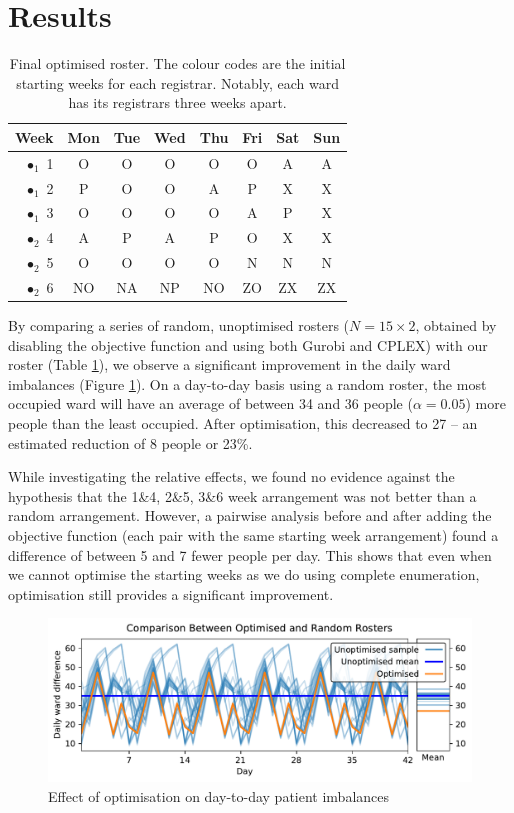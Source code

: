 \documentclass[a4paper]{article}
\begin{document}
\section{Results}
\begin{table}[H]
\centering
\caption{Final optimised roster. The colour codes are the initial starting weeks for each registrar. Notably, each ward has its registrars three weeks apart.}
\label{tab:roster}
\begin{tabular}{r|ccccccc}
Week	&Mon	&Tue	&Wed	&Thu	&Fri	&Sat	&Sun	\\
\hline
{\color{LIME}$\bullet_1$} 1	& O	& O	& O	& O	& O	& A	& A	\\
{\color{NAVY}$\bullet_1$} 2	& P	& O	& O	& A	& P	& X	& X	\\
{\color{YELLOW}$\bullet_1$} 3	& O	& O	& O	& O	& A	& P	& X	\\
{\color{LIME}$\bullet_2$} 4	& A	& P	& A	& P	& O	& X	& X	\\
{\color{NAVY}$\bullet_2$} 5	& O	& O	& O	& O	& N	& N	& N	\\
{\color{YELLOW}$\bullet_2$} 6	& NO	& NA	& NP	& NO	& ZO	& ZX	& ZX	\\
\end{tabular}
\end{table}

By comparing a series of random, unoptimised rosters ($N=15\times 2$, obtained by disabling the objective function and using both Gurobi and CPLEX) with our roster (Table \ref{tab:roster}), we observe a significant improvement in the daily ward imbalances (Figure \ref{fig:comparison}). On a day-to-day basis using a random roster, the most occupied ward will have an average of between 34 and 36 people ($\alpha = 0.05$) more people than the least occupied. After optimisation, this decreased to 27 -- an estimated reduction of 8 people or 23\%.

While investigating the relative effects, we found no evidence against the hypothesis that the 1\&4, 2\&5, 3\&6 week arrangement was not better than a random arrangement. However, a pairwise analysis before and after adding the objective function (each pair with the same starting week arrangement) found a difference of between 5 and 7 fewer people per day. This shows that even when we cannot optimise the starting weeks as we do using complete enumeration, optimisation still provides a significant improvement.

\begin{figure}[h]
    \centering\includegraphics[width=\linewidth]{../results/comparison}
    \caption{Effect of optimisation on day-to-day patient imbalances}
    \label{fig:comparison}
\end{figure}
\end{document}
